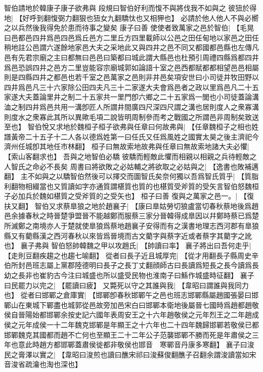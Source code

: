 智伯請地於韓康子康子欲弗與
段規曰智伯好利而愎不與將伐我不如與之
彼狃於得地|{
	【好呼到翻愎弼力翻狠也狃女九翻驕忲也又相狎也】
	}
必請於他人他人不與必嚮之以兵然後我得免於患而待事之變矣
康子曰善
使使者致萬家之邑於智伯|{
	【毛晃曰邑都邑四井爲邑四邑爲丘邑方二里丘方四里載師以公邑之田任甸地以家邑之田任稍地註公邑謂六遂餘地家邑大夫之采地此又與四井之邑不同又都國都邑縣也左傳凡邑有先君宗廟之主曰都無曰邑邑曰築都曰城此謂大縣邑也杜預引周禮四縣爲都四井爲邑恐誤四井之邑方二里豈能容宗廟城郭如論語十室之邑西都賦都都相望邑邑相屬則是四縣四井之都邑也若千室之邑萬家之邑則非井邑矣項安世曰小司徒井牧田野以四井爲邑凡三十六家除公田四夫凡三十二家遂大夫會爲邑者之政以里爲邑凡二十五家遂大夫蓋論里井之制二十五家共一里門卽六鄉之二十五家爲一閭也小司徒蓋論溝洫之制四井爲邑共用一溝卽匠人所謂井間廣四尺深四尺謂之溝也居則度人之衆寡溝則度水之衆寡此其所以異歟毛項二說皆明周制參而考之戰國之所謂邑非周制矣致送至也】}
智伯悅又求地於魏桓子桓子欲弗與任章曰何故弗與|{
	【任章魏桓子之相也姓譜黃帝二十五子十二人各以德爲姓第一曰任氏又任爲風姓之國實太昊之後主濟祀今濟州任城卽其地任市林翻】
	}
桓子曰無故索地故弗與任章曰無故索地諸大夫必懼|{
	【索山客翻求也】
	}
吾與之地智伯必驕
彼驕而輕敵此懼而相親以相親之兵待輕敵之人智氏之命必不長矣
周書曰將欲敗之必姑輔之將欲取之必姑與之|{
	【逸書也敗補邁翻】
	}
主不如與之以驕智伯然後可以擇交而圖智氏矣奈何獨以吾爲智氏質乎|{
	【質脂利翻物相綴當也又質讀如字亦通質謂椹質也質的也椹質受斧質的受矢言智伯怒魏桓子必加兵於魏如椹質之受斧質的之受矢也】}
桓子曰善
復與之萬家之邑一。|{
	【復扶又翻】
	}
智伯又求蔡臯狼之地於趙襄子|{
	【康曰臯姑勞切狼盧當切春秋蔡地後爲趙邑余據春秋之時晉楚爭盟晉不能越鄭而服蔡三家分晉韓得成臯因以幷鄭時蔡已爲楚所滅鄭之南境亦人于楚就使臯狼爲蔡地趙襄子安得而有之漢書地理志西河郡有臯狼縣又有藺縣漢之西河春秋以來皆爲晉境而古文藺字與蔡字近或者蔡字其藺字之訛也】}
襄子弗與
智伯怒帥韓魏之甲以攻趙氏|{
	【帥讀曰率】}
襄子將出曰吾何走乎|{
	【走則豆翻疾趨之也趨七喻翻】}
從者曰長子近且城厚完|{
	【從才用翻長子縣周史辛伯所封邑班志屬上黨郡陸德明曰長子之長丁丈翻顔師古曰長讀爲短長之長今讀爲長幼之長非也崔豹古今注曰城盛也所以盛受民物也淮南子曰鯀作城盛時征翻】}
襄子曰民罷力以完之|{
	【罷讀曰疲】}
又斃死以守之其誰與我|{
	【韋昭曰謂誰與我同力也】}
從者曰邯鄲之倉庫實|{
	【邯鄲卽春秋邯鄲午之邑也班志邯鄲縣屬趙國張晏曰邯鄲山在東城下鄲盡也城郭從邑故旁加邑宋白曰邯鄲本衛地後屬晉七國時爲趙都趙敬侯自晉陽始都邯鄲余按史記六國年表周安王之十六年趙敬侯之元年烈王之二年趙成侯之元年成侯一十二年魏克邯鄲是年顯王之十六年也二十四年魏歸邯鄲若敬侯已都邯鄲魏克其國都而趙不亡何也至顯王二十二年公子范襲邯鄲不勝而死是年肅侯之三年也意此時趙方都邯鄲蓋肅侯徙都非敬侯也邯音　寒鄲音丹康多寒翻】}
襄子曰浚民之膏澤以實之|{
	【韋昭曰浚煎也讀曰醮宋祁曰浚蘇俊翻醮子召翻余謂浚讀當如宋音浚省疏瀹也淘也深也】}
